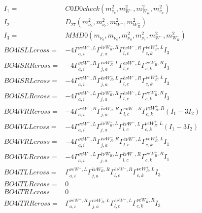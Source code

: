 \documentclass[A4,landscape]{article}
\begin{document}
\begin{align} 
I_1 = & C0D0check(m^2_{\nu_{{c}}}, m^2_{W^-}, m^2_{W_R^-}, m^2_{\nu_{{a}}}) \\ 
I_2 = & D_{27}(m^2_{\nu_{{a}}}, m^2_{\nu_{{c}}}, m^2_{W^-}, m^2_{W_R^-}) \\ 
I_3 = & MMD0(m_{\nu_{{a}}}, m_{\nu_{{c}}}, m^2_{\nu_{{a}}}, m^2_{\nu_{{c}}}, m^2_{W^-}, m^2_{W_R^-}) \\ 
  BO4lSLLcross= & -4  \Gamma^{\nu e W^+,L}_{a, i} \Gamma^{\bar{e}\nu W_R^- ,R}_{j, a} \Gamma^{\bar{e}\nu W^- ,R}_{l, c} \Gamma^{\nu e W_R^+,L}_{c, k} I_3 \\ 
  BO4lSRRcross= & -4  \Gamma^{\nu e W^+,R}_{a, i} \Gamma^{\bar{e}\nu W_R^- ,L}_{j, a} \Gamma^{\bar{e}\nu W^- ,L}_{l, c} \Gamma^{\nu e W_R^+,R}_{c, k} I_3 \\ 
  BO4lSRLcross= & -4  \Gamma^{\nu e W^+,R}_{a, i} \Gamma^{\bar{e}\nu W_R^- ,L}_{j, a} \Gamma^{\bar{e}\nu W^- ,R}_{l, c} \Gamma^{\nu e W_R^+,L}_{c, k} I_3 \\ 
  BO4lSLRcross= & -4  \Gamma^{\nu e W^+,L}_{a, i} \Gamma^{\bar{e}\nu W_R^- ,R}_{j, a} \Gamma^{\bar{e}\nu W^- ,L}_{l, c} \Gamma^{\nu e W_R^+,R}_{c, k} I_3 \\ 
  BO4lVRRcross= & -4  \Gamma^{\nu e W^+,R}_{a, i} \Gamma^{\bar{e}\nu W_R^- ,R}_{j, a} \Gamma^{\bar{e}\nu W^- ,R}_{l, c} \Gamma^{\nu e W_R^+,R}_{c, k} (I_1 - 3 I_2) \\ 
  BO4lVLLcross= & -4  \Gamma^{\nu e W^+,L}_{a, i} \Gamma^{\bar{e}\nu W_R^- ,L}_{j, a} \Gamma^{\bar{e}\nu W^- ,L}_{l, c} \Gamma^{\nu e W_R^+,L}_{c, k} (I_1 - 3 I_2) \\ 
  BO4lVRLcross= & -4  \Gamma^{\nu e W^+,R}_{a, i} \Gamma^{\bar{e}\nu W_R^- ,R}_{j, a} \Gamma^{\bar{e}\nu W^- ,L}_{l, c} \Gamma^{\nu e W_R^+,L}_{c, k} I_1 \\ 
  BO4lVLRcross= & -4  \Gamma^{\nu e W^+,L}_{a, i} \Gamma^{\bar{e}\nu W_R^- ,L}_{j, a} \Gamma^{\bar{e}\nu W^- ,R}_{l, c} \Gamma^{\nu e W_R^+,R}_{c, k} I_1 \\ 
  BO4lTLLcross= &  \Gamma^{\nu e W^+,L}_{a, i} \Gamma^{\bar{e}\nu W_R^- ,R}_{j, a} \Gamma^{\bar{e}\nu W^- ,R}_{l, c} \Gamma^{\nu e W_R^+,L}_{c, k} I_3 \\ 
  BO4lTLRcross= & 0 \\ 
  BO4lTRLcross= & 0 \\ 
  BO4lTRRcross= &  \Gamma^{\nu e W^+,R}_{a, i} \Gamma^{\bar{e}\nu W_R^- ,L}_{j, a} \Gamma^{\bar{e}\nu W^- ,L}_{l, c} \Gamma^{\nu e W_R^+,R}_{c, k} I_3 \\ 
\end{align} 
\end{document}
